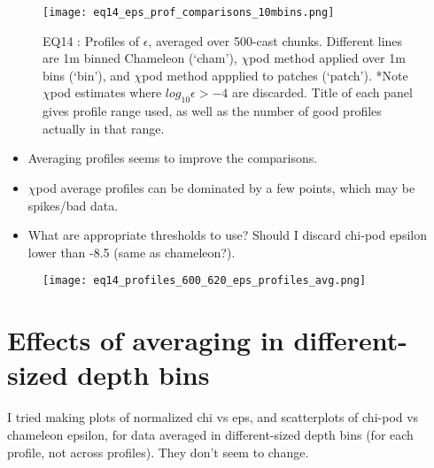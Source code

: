 \documentclass[11pt]{article}
\begin{document}



\begin{figure}[htbp]
\texttt{[image: eq14\_eps\_prof\_comparisons\_10mbins.png]}
\caption{EQ14 : Profiles of $\epsilon$, averaged over 500-cast chunks. Different lines are 1m binned Chameleon (`cham'), $\chi$pod method applied over 1m bins (`bin'), and $\chi$pod method appplied to patches (`patch'). *Note $\chi$pod estimates where $log_{10}\epsilon>-4$ are discarded. Title of each panel gives profile range used, as well as the number of good profiles actually in that range.}
\label{eps_prof_comp_eq14}
\end{figure}


\begin{itemize}
\item Averaging profiles seems to improve the comparisons.
\item $\chi$pod average profiles can be dominated by a few points, which may be spikes/bad data. 
\item What are appropriate thresholds to use? Should I discard chi-pod epsilon lower than -8.5 (same as chameleon?).
\end{itemize}


\begin{figure}[htbp]
\texttt{[image: eq14\_profiles\_600\_620\_eps\_profiles\_avg.png]}
\caption{}
\label{}
\end{figure}





\clearpage
\section{Effects of averaging in different-sized depth bins}

I tried making plots of normalized chi vs eps, and scatterplots of chi-pod vs chameleon epsilon, for data averaged in different-sized depth bins (for each profile, not across profiles). They don't seem to change.
\end{document}
